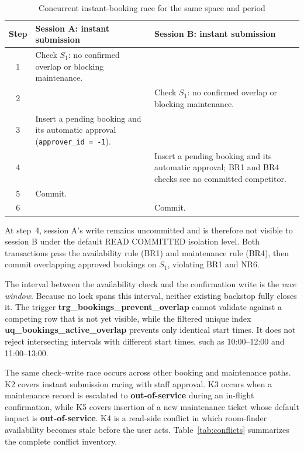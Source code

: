 \begin{table}[htbp]
    \centering
    \small
    \renewcommand{\arraystretch}{1.15}
    \begin{tabularx}{\textwidth}{c
        >{\RaggedRight\arraybackslash}X
        >{\RaggedRight\arraybackslash}X}
        \toprule
        \textbf{Step} & \textbf{Session A: instant submission} &
        \textbf{Session B: instant submission} \\
        \midrule
        1 & Check $S_1$: no confirmed overlap or blocking maintenance. & \\
        2 & & Check $S_1$: no confirmed overlap or blocking maintenance. \\
        3 & Insert a pending booking and its automatic approval
        (\texttt{approver\_id = -1}). & \\
        4 & & Insert a pending booking and its automatic approval; BR1 and BR4
        checks see no committed competitor. \\
        5 & Commit. & \\
        6 & & Commit. \\
        \bottomrule
    \end{tabularx}
    \caption{Concurrent instant-booking race for the same space and period}
    \label{tab:race-sequence}
\end{table}
\FloatBarrier

At step~4, session A's write remains uncommitted and is therefore not visible
to session B under the default READ COMMITTED isolation level. Both
transactions pass the availability rule (BR1) and maintenance rule (BR4), then
commit overlapping approved bookings on $S_1$, violating BR1 and NR6.

The interval between the availability check and the confirmation write is the
\emph{race window}. Because no lock spans this interval, neither existing
backstop fully closes it. The trigger
\textbf{trg\_bookings\_prevent\_overlap} cannot validate against a competing
row that is not yet visible, while the filtered unique index
\textbf{uq\_bookings\_active\_overlap} prevents only identical start times.
It does not reject intersecting intervals with different start times, such as
10:00--12:00 and 11:00--13:00.

The same check--write race occurs across other booking and maintenance paths.
K2 covers instant submission racing with staff approval. K3 occurs when a
maintenance record is escalated to \textbf{out-of-service} during an in-flight
confirmation, while K5 covers insertion of a new maintenance ticket whose
default impact is \textbf{out-of-service}. K4 is a read-side conflict in which
room-finder availability becomes stale before the user acts.
Table~\ref{tab:conflicts} summarizes the complete conflict inventory.

